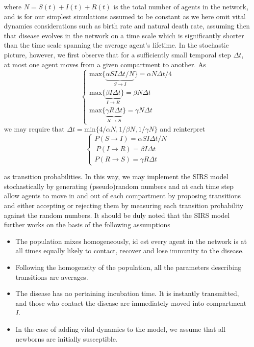 where $N = S(t) + I(t) + R(t)$ is the total number of agents in the network, and is for our simplest simulations assumed to be constant as we here omit vital dynamics considerations such as birth rate and natural death rate, assuming then that disease evolves in the network on a time scale which is significantly shorter than the time scale spanning the average agent's lifetime. In the stochastic picture, however, we first observe that for a sufficiently small temporal step $\Delta t$, at most one agent moves from a given compartment to another. As 
$$
\begin{cases}
\text{max}\{\underbrace{\alpha SI\Delta t/N}_{S\to I}\} = \alpha N\Delta t/4\\

\text{max}\{\underbrace{\beta I\Delta t}_{I\to R}\} = \beta N\Delta t \\

\text{max}\{\underbrace{\gamma R \Delta t}_{R\to S}\} = \gamma N\Delta t
\end{cases}
$$
we may require that $\Delta t = \text{min}\{4/\alpha N, 1/\beta N, 1/\gamma N\}$ and reinterpret
$$
\begin{cases}
P(S\to I) = \alpha SI\Delta t/N\\\
P(I\to R) = \beta I\Delta t\\
P(R\to S) = \gamma R \Delta t
\end{cases}
$$

as transition probabilities. In this way, we may implement the SIRS model stochastically by generating (pseudo)random numbers and at each time step allow agents to move in and out of each compartment by proposing transitions and either accepting or rejecting them by measuring each transition probability against the random numbers. It should be duly noted that the SIRS model further works on the basis of the following assumptions\\

\begin{itemize}
    \item The population mixes homogeneously, id est every agent in the network is at all times equally likely to contact, recover and lose immunity to the disease.
    \item Following the homogeneity of the population, all the parameters describing transitions are averages.
    \item The disease has no pertaining incubation time. It is instantly transmitted, and those who contact the disease are immediately moved into compartment $I$.
    \item In the case of adding vital dynamics to the model, we assume that all newborns are initially susceptible.
\end{itemize}

